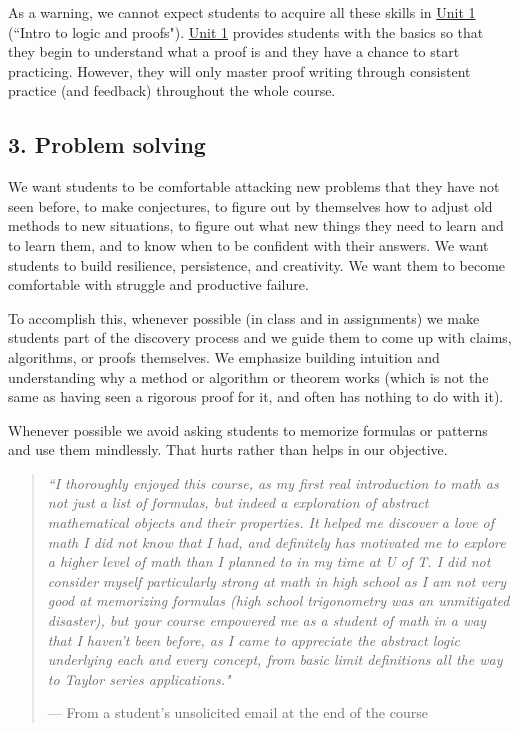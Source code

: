 \documentclass[11pt]{article}
\begin{document}
{\baselineskip
As a warning, we cannot expect students to acquire all these skills in \hyperref[unit1]{Unit 1} (``Intro to logic and proofs").  \hyperref[unit1]{Unit 1} provides students with the basics so that they begin to understand what a proof is and they have a chance to start practicing.   However, they will only master proof writing through consistent practice (and feedback) throughout the whole course.
}

\subsection{3. Problem solving}\label{CO3}

We want students to be comfortable attacking new problems that they have not seen before, to make conjectures, to figure out by themselves how to adjust old methods to new situations, to figure out what new things they need to learn and to learn them, and to know when to be confident with their answers.    We want students to build resilience, persistence, and creativity.  We want them to become comfortable with struggle and productive failure.

{\baselineskip
To accomplish this,  whenever possible (in class and in assignments) we make students part of the discovery process and we guide them to come up with claims, algorithms, or proofs themselves.  We emphasize building intuition and understanding why a method or algorithm or theorem works (which is not the same as having seen a rigorous proof for it, and often has nothing to do with it).

Whenever possible we avoid asking students to memorize formulas or patterns and use them mindlessly.   That hurts rather than helps in our objective.
}



\vfill


\begin{quotation}
\noindent \emph{``I thoroughly enjoyed this course, as my first real introduction to math as not just a list of formulas, but indeed a exploration of abstract mathematical objects and their properties. It helped me discover a love of math I did not know that I had, and definitely has motivated me to explore  a higher level of math than I planned to in my time at U of T. I did not consider myself particularly strong at math in high school as I am not very good at memorizing formulas (high school trigonometry was an unmitigated disaster), but your course empowered me as a student of math in a way that I haven't been before, as I came to appreciate the abstract logic underlying each and every concept, from basic limit definitions all the way to Taylor series applications."}

\hfill --- From a student's unsolicited email at the end of the course
\end{quotation}
\end{document}
